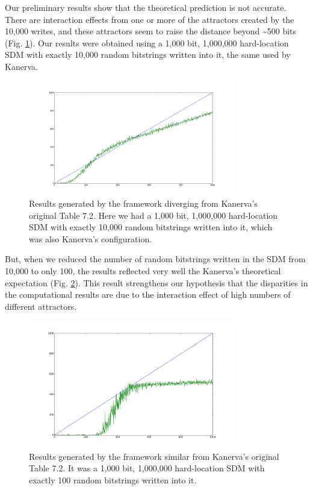 Our preliminary results show that the theoretical prediction is not accurate.  There are interaction effects from one or more of the attractors created by the 10,000 writes, and these attractors seem to raise the distance beyond \textasciitilde 500 bits (Fig. \ref{sdm-10000w-table-7-2}). Our results were obtained using a 1,000 bit, 1,000,000 hard-location SDM with exactly 10,000 random bitstrings written into it, the same used by Kanerva.

\begin{figure}[h]
\centering\includegraphics[width=0.8\textwidth]{images02/sdm-10000w-table-7-2.png}
\caption{Results generated by the framework diverging from Kanerva's original Table 7.2. Here we had a 1,000 bit, 1,000,000 hard-location SDM with exactly 10,000 random bitstrings written into it, which was also Kanerva's configuration.
\label{sdm-10000w-table-7-2}}
\end{figure}

But, when we reduced the number of random bitstrings written in the SDM from 10,000 to only 100, the results reflected very well the Kanerva's theoretical expectation (Fig. \ref{sdm-100w-table-7-2}). This result strengthens our hypothesis that the disparities in the computational results are due to the interaction effect of high numbers of different attractors.

\begin{figure}[h]
\centering\includegraphics[width=0.8\textwidth]{images02/sdm-100w-table-7-2.png}
\caption{Results generated by the framework similar from Kanerva's original Table 7.2. It was a 1,000 bit, 1,000,000 hard-location SDM with exactly 100 random bitstrings written into it.
\label{sdm-100w-table-7-2}}
\end{figure}

